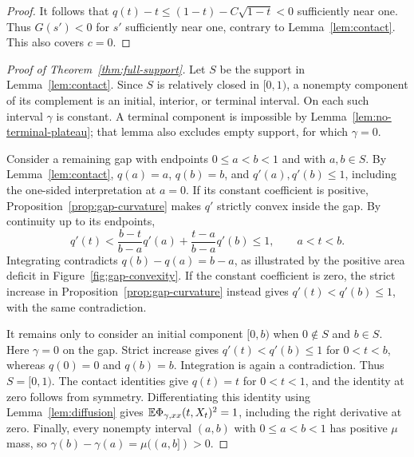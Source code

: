 \begin{proof}
It follows that
$q(t)-t\leq (1-t)-C\sqrt{1-t}<0$ sufficiently near one.
Thus $G(s')<0$ for $s'$ sufficiently near one, contrary to
Lemma~\ref{lem:contact}.  This also covers $c=0$.
\end{proof}

\begin{proof}[Proof of Theorem~\ref{thm:full-support}]
Let $S$ be the support in Lemma~\ref{lem:contact}.  Since $S$
is relatively closed in $[0,1)$, a nonempty component of its
complement is an initial, interior, or terminal interval.
On each such interval $\gamma$ is constant.  A terminal
component is impossible by Lemma~\ref{lem:no-terminal-plateau};
that lemma also excludes empty support, for which $\gamma=0$.

Consider a remaining gap with endpoints $0\leq a<b<1$ and
with $a,b\in S$.  By Lemma~\ref{lem:contact},
$q(a)=a$, $q(b)=b$, and $q'(a),q'(b)\leq1$, including the
one-sided interpretation at $a=0$.  If its constant coefficient
is positive, Proposition~\ref{prop:gap-curvature} makes $q'$
strictly convex inside the gap.  By continuity up to its endpoints,
\[
 q'(t)<\frac{b-t}{b-a}q'(a)+\frac{t-a}{b-a}q'(b)\leq1,
 \qquad a<t<b.
\]
Integrating contradicts $q(b)-q(a)=b-a$, as illustrated by the positive
area deficit in Figure~\ref{fig:gap-convexity}.
If the constant coefficient is zero, the strict increase in
Proposition~\ref{prop:gap-curvature} instead gives
$q'(t)<q'(b)\leq1$, with the same contradiction.

It remains only to consider an initial component $[0,b)$ when
$0\notin S$ and $b\in S$.  Here $\gamma=0$ on the gap.
Strict increase gives $q'(t)<q'(b)\leq1$ for $0<t<b$, whereas
$q(0)=0$ and $q(b)=b$.  Integration is again a contradiction.
Thus $S=[0,1)$.  The contact identities give $q(t)=t$ for
$0<t<1$, and the identity at zero follows from symmetry.
Differentiating this identity using Lemma~\ref{lem:diffusion} gives
$\mathbb E\Phi_{\gamma,xx}(t,X_t)^2=1$, including the right derivative
at zero. Finally, every nonempty interval $(a,b)$ with
$0\leq a<b<1$ has positive $\mu$ mass, so
$\gamma(b)-\gamma(a)=\mu((a,b])>0$.
\end{proof}
